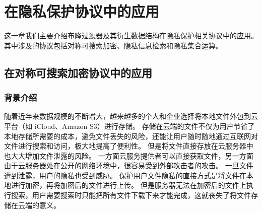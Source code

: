 
\chapter{在隐私保护协议中的应用}\label{chp:application}


这一章我们主要介绍布隆过滤器及其衍生数据结构在隐私保护相关协议中的应用。
其中涉及的协议包括对称可搜索加密、隐私信息检索和隐私集合运算。

\section{在对称可搜索加密协议中的应用}

\subsection{背景介绍}

随着近年来数据规模的不断增大，越来越多的个人和企业选择将本地文件外包到云平台（如 iCloud、Amazon S3）进行存储。
存储在云端的文件不仅为用户节省了本地存储所需要的成本，避免文件丢失的风险，还能让用户随时随地通过互联网对文件进行搜索和访问，极大地提高了便利性。
但是将文件直接存放在云服务器中也大大增加文件泄露的风险。
一方面云服务提供者可以直接获取文件，另一方面由于云服务器处在公开的网络环境中，很容易受到外部攻击者的攻击。
一旦文件遭到泄露，用户的隐私也受到威胁。
保护用户文件隐私的直接方式是将文件在本地进行加密，再将加密后的文件进行上传。
但是服务器无法在加密后的文件上执行搜索，用户需要搜索时只能把所有文件下载下来才能完成，这就丧失了将文件存储在云端的意义。

